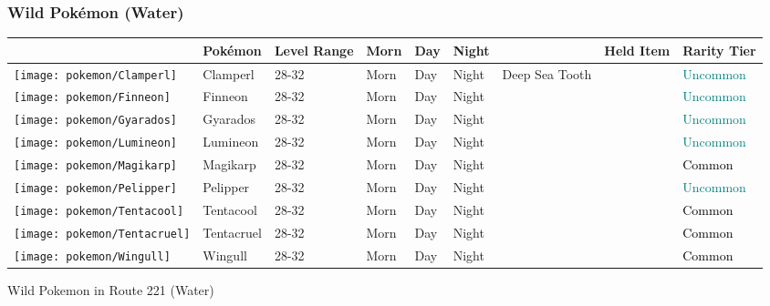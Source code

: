 \subsubsection{Wild Pokémon (Water)}%
\label{ssubsec:WildPokmon(Water)}%
\begin{longtable}{||l l l l l l l l l||}%
\hline%
&Pokémon&Level Range&Morn&Day&Night&&Held Item&Rarity Tier\\%
\hline%
\endhead%
\hline%
\texttt{[image: pokemon/Clamperl]}&Clamperl&28{-}32&Morn&Day&Night&Deep Sea Tooth&&\textcolor{teal}{%
Uncommon%
}\\%
\hline%
\texttt{[image: pokemon/Finneon]}&Finneon&28{-}32&Morn&Day&Night&&&\textcolor{teal}{%
Uncommon%
}\\%
\hline%
\texttt{[image: pokemon/Gyarados]}&Gyarados&28{-}32&Morn&Day&Night&&&\textcolor{teal}{%
Uncommon%
}\\%
\hline%
\texttt{[image: pokemon/Lumineon]}&Lumineon&28{-}32&Morn&Day&Night&&&\textcolor{teal}{%
Uncommon%
}\\%
\hline%
\texttt{[image: pokemon/Magikarp]}&Magikarp&28{-}32&Morn&Day&Night&&&\textcolor{black}{%
Common%
}\\%
\hline%
\texttt{[image: pokemon/Pelipper]}&Pelipper&28{-}32&Morn&Day&Night&&&\textcolor{teal}{%
Uncommon%
}\\%
\hline%
\texttt{[image: pokemon/Tentacool]}&Tentacool&28{-}32&Morn&Day&Night&&&\textcolor{black}{%
Common%
}\\%
\hline%
\texttt{[image: pokemon/Tentacruel]}&Tentacruel&28{-}32&Morn&Day&Night&&&\textcolor{black}{%
Common%
}\\%
\hline%
\texttt{[image: pokemon/Wingull]}&Wingull&28{-}32&Morn&Day&Night&&&\textcolor{black}{%
Common%
}\\%
\hline%
\end{longtable}%
\caption{Wild Pokemon in Route 221 (Water)}
